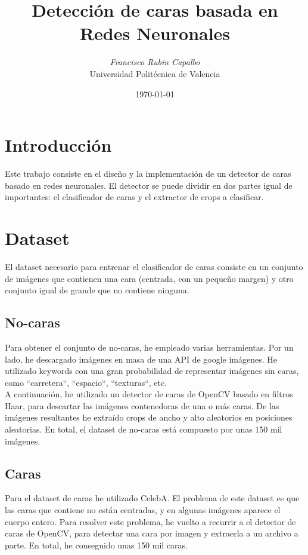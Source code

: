 \documentclass[a4paper, 11pt]{article}
\title{\Large{\textbf{Detección de caras basada en Redes Neuronales}}}
\author{\textit{Francisco Rubin Capalbo}\\
		Universidad Politécnica de Valencia }
\date{\today}
\begin{document}
    
    \maketitle
    \section{Introducción}
    	Este trabajo consiste en el diseño y la implementación de un detector de caras basado en redes neuronales. El detector se puede dividir en dos partes igual de importantes: el clasificador de caras y el extractor de crops a clasificar. \\
    \section{Dataset}
		El dataset necesario para entrenar el clasificador de caras consiste en un conjunto de imágenes que contienen una cara (centrada, con un pequeño margen) y otro conjunto igual de grande que no contiene ninguna. 
		
		\subsection{No-caras}
		Para obtener el conjunto de no-caras\cite{script-no-caras}, he empleado varias herramientas. Por un lado, he descargado imágenes en masa de una API de google imágenes. He utilizado keywords con una gran probabilidad de representar imágenes sin caras, como ``carretera``, ``espacio``, ``texturas``, etc. \\
		
		 A continuación, he utilizado un detector de caras de OpenCV basado en filtros Haar, para descartar las imágenes contenedoras de una o más caras. De las imágenes resultantes he extraído crops de ancho y alto aleatorios en posiciones aleatorias. En total, el dataset de no-caras está compuesto por unas 150 mil imágenes. 
		 
		 \subsection{Caras}
		 Para el dataset de caras he utilizado CelebA\cite{celeb-a}. El problema de este dataset es que las caras que contiene no están centradas, y en algunas imágenes aparece el cuerpo entero. Para resolver este problema, he vuelto a recurrir a el detector de caras de OpenCV\cite{script-caras}, para detectar una cara por imagen y extraerla a un archivo a parte. En total, he conseguido unas 150 mil caras. 
\end{document}
